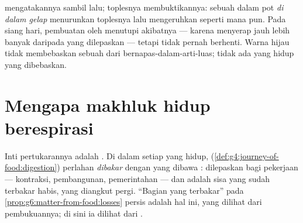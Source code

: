 \begin{remark}\label{rem:g7:what-is-respiration:plants}
 mengatakannya sambil lalu;
toplesnya membuktikannya: sebuah  dalam pot \emph{di dalam
gelap} menurunkan  toplesnya lalu mengeruhkan 
seperti  mana pun. Pada siang hari, pembuatan oleh 
menutupi akibatnya --- karena menyerap  jauh lebih
banyak daripada yang dilepaskan  --- tetapi 
tidak pernah berhenti. Warna hijau tidak membebaskan sebuah  dari
bernapas-dalam-arti-luas; tidak ada yang hidup yang dibebaskan.
\end{remark}

\section{Mengapa makhluk hidup berespirasi}

\begin{proposition}\label{prop:g7:what-is-respiration:power}
Inti pertukarannya adalah \emph{}. Di dalam setiap  yang
hidup,  (\cref{def:g4:journey-of-food:digestion}) perlahan
\emph{dibakar} dengan  yang dibawa : 
dilepaskan bagi pekerjaan  --- kontraksi, pembangunan,
pemerintahan --- dan  adalah sisa yang sudah
terbakar habis, yang diangkut pergi. ``Bagian yang terbakar'' pada
\cref{prop:g6:matter-from-food:losses} persis adalah hal ini, yang
dilihat dari pembukuannya; di sini ia dilihat dari .
\end{proposition}
\admitted

